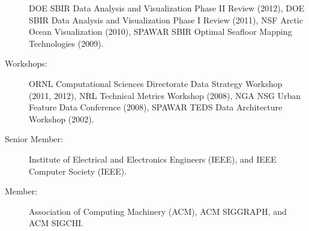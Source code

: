 \documentclass[11pt, letterpaper]{article}
\begin{document}
\begin{sloppypar}
\begin{description}
  DOE SBIR Data Analysis and Visualization Phase II Review
  (2012), DOE SBIR Data Analysis and Visualization Phase I Review (2011),
  NSF Arctic Ocean Visualization (2010), SPAWAR SBIR Optimal
  Seafloor Mapping Technologies (2009).
  \item[Workshops:] ORNL Computational Sciences Directorate Data Strategy
  Workshop (2011, 2012), NRL Technical Metrics Workshop (2008), NGA NSG Urban
  Feature Data Conference (2008), SPAWAR TEDS Data Architecture Workshop (2002).
  \item[Senior Member:] Institute of Electrical and Electronics Engineers
  (IEEE), and IEEE Computer Society (IEEE).
  \item[Member:] Association of Computing Machinery (ACM), ACM SIGGRAPH,
  and ACM SIGCHI.
\end{description}
\end{sloppypar}
\end{document}
